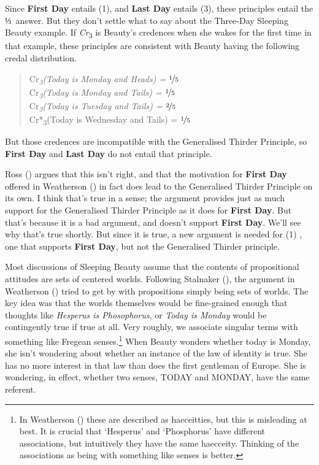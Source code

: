 \documentclass[
  11pt,
  letterpaper,
  DIV=11,
  numbers=noendperiod,
  twoside]{scrartcl}
\begin{document}
Since \textbf{First Day} entails (1), and \textbf{Last Day} entails (3),
these principles entail the ⅓~answer. But they don't settle what to say
about the Three-Day Sleeping Beauty example. If
\emph{Cr}\textsubscript{3} is Beauty's credences when she wakes for the
first time in that example, these principles are consistent with Beauty
having the following credal distribution.

\begin{quote}
\noindent *Cr\emph{\textsubscript{3}(Today is Monday and Heads) =
\(\nicefrac{1}{5}\)~\\
}Cr\emph{\textsubscript{3}(Today is Monday and Tails) =
\(\nicefrac{1}{5}\)~\\
}Cr\emph{\textsubscript{3}(Today is Tuesday and Tails) =
\(\nicefrac{2}{5}\)~\\
}Cr*\textsubscript{3}(Today is Wednesday and Tails) =
\(\nicefrac{1}{5}\)~
\end{quote}

But those credences are incompatible with the Generalised Thirder
Principle, so \textbf{First Day} and \textbf{Last Day} do not entail
that principle.

Ross () argues that this isn't right, and
that the motivation for \textbf{First Day} offered in Weatherson
() in fact does lead to the
Generalised Thirder Principle on its own. I think that's true in a
sense; the argument provides just as much support for the Generalised
Thirder Principle as it does for \textbf{First Day}. But that's because
it is a bad argument, and doesn't support \textbf{First Day}. We'll see
why that's true shortly. But since it is true, a new argument is needed
for (1) , one that supports \textbf{First Day}, but not the Generalised
Thirder principle.

Most discussions of Sleeping Beauty assume that the contents of
propositional attitudes are sets of centered worlds. Following Stalnaker
(), the argument in Weatherson
() tried to get by with propositions
simply being sets of worlds. The key idea was that the worlds themselves
would be fine-grained enough that thoughts like \emph{Hesperus is
Phosophorus}, or \emph{Today is Monday} would be contingently true if
true at all. Very roughly, we associate singular terms with something
like Fregean senses.\footnote{In Weatherson
  () these are described as
  haeceitties, but this is misleading at best. It is crucial that
  `Hesperus' and `Phosphorus' have different associations, but
  intuitively they have the same haecceity. Thinking of the associations
  as being with something like senses is better.} When Beauty wonders
whether today is Monday, she isn't wondering about whether an instance
of the law of identity is true. She has no more interest in that law
than does the first gentleman of Europe. She is wondering, in effect,
whether two senses, TODAY and MONDAY, have the same referent.
\end{document}
